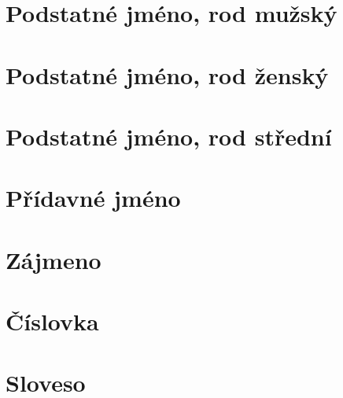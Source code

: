 \section{Podstatné jméno, rod mužský}            \label{sec:morpho_m}
%
\clearpage

\section{Podstatné jméno, rod ženský}            \label{sec:morpho_f}
%
\clearpage

\section{Podstatné jméno, rod střední}           \label{sec:morpho_n}
%
\clearpage

\section{Přídavné jméno}                         \label{sec:morpho_adj}
%
\clearpage

\section{Zájmeno}                                \label{sec:morpho_pron}
%
\clearpage

\section{Číslovka}                               \label{sec:morpho_num}
\clearpage

\section{Sloveso}                                \label{sec:morpho_v}
%
%

\fi


\ifmakebackmatter


